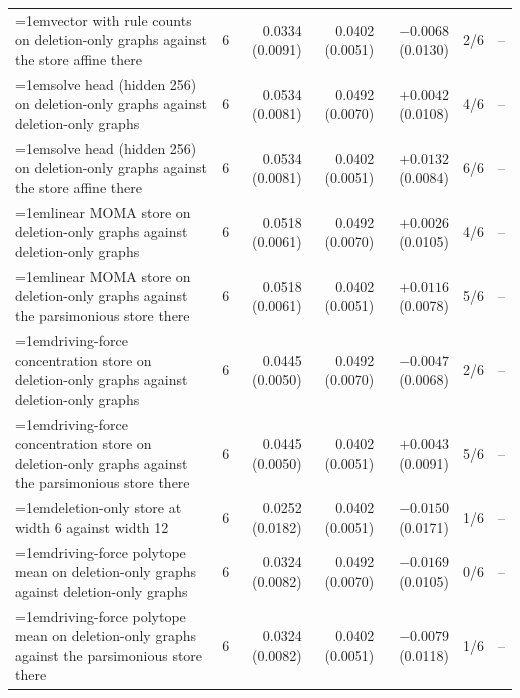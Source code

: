 \begin{table}[H]
\begin{tabular}{@{}>{\raggedright\hangindent=1em\hangafter=1\arraybackslash}p{84.3mm}rrrrrr@{}}
    vector with rule counts on deletion-only graphs against the store affine there & 6 & 0.0334 (0.0091) & 0.0402 (0.0051) & $-0.0068$ (0.0130) & 2/6 & -- \\
    solve head (hidden 256) on deletion-only graphs against deletion-only graphs & 6 & 0.0534 (0.0081) & 0.0492 (0.0070) & $+0.0042$ (0.0108) & 4/6 & -- \\
    solve head (hidden 256) on deletion-only graphs against the store affine there & 6 & 0.0534 (0.0081) & 0.0402 (0.0051) & $+0.0132$ (0.0084) & 6/6 & -- \\
    linear MOMA store on deletion-only graphs against deletion-only graphs & 6 & 0.0518 (0.0061) & 0.0492 (0.0070) & $+0.0026$ (0.0105) & 4/6 & -- \\
    linear MOMA store on deletion-only graphs against the parsimonious store there & 6 & 0.0518 (0.0061) & 0.0402 (0.0051) & $+0.0116$ (0.0078) & 5/6 & -- \\
    driving-force concentration store on deletion-only graphs against deletion-only graphs & 6 & 0.0445 (0.0050) & 0.0492 (0.0070) & $-0.0047$ (0.0068) & 2/6 & -- \\
    driving-force concentration store on deletion-only graphs against the parsimonious store there & 6 & 0.0445 (0.0050) & 0.0402 (0.0051) & $+0.0043$ (0.0091) & 5/6 & -- \\
    deletion-only store at width 6 against width 12 & 6 & 0.0252 (0.0182) & 0.0402 (0.0051) & $-0.0150$ (0.0171) & 1/6 & -- \\
    driving-force polytope mean on deletion-only graphs against deletion-only graphs & 6 & 0.0324 (0.0082) & 0.0492 (0.0070) & $-0.0169$ (0.0105) & 0/6 & -- \\
    driving-force polytope mean on deletion-only graphs against the parsimonious store there & 6 & 0.0324 (0.0082) & 0.0402 (0.0051) & $-0.0079$ (0.0118) & 1/6 & -- \\
    \hline
  \end{tabular}
\end{table}

